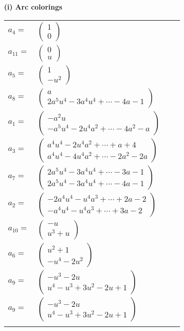 \documentclass[1p]{elsarticle_modified}
\theoremstyle{definition}
\begin{document}
\flushleft \textbf{(i) Arc colorings}\\
\begin{tabular}{m{7pt} m{180pt} m{7pt} m{180pt} }
\flushright $a_{4}=$&$\begin{pmatrix}1\\0\end{pmatrix}$ \\
\flushright $a_{11}=$&$\begin{pmatrix}0\\u\end{pmatrix}$ \\
\flushright $a_{5}=$&$\begin{pmatrix}1\\- u^2\end{pmatrix}$ \\
\flushright $a_{8}=$&$\begin{pmatrix}a\\2 a^5 u^4-3 a^4 u^4+\cdots-4 a-1\end{pmatrix}$ \\
\flushright $a_{1}=$&$\begin{pmatrix}- a^2 u\\- a^5 u^4-2 u^4 a^2+\cdots-4 a^2- a\end{pmatrix}$ \\
\flushright $a_{3}=$&$\begin{pmatrix}a^4 u^4-2 u^4 a^2+\cdots+a+4\\a^4 u^4-4 u^4 a^2+\cdots-2 a^2-2 a\end{pmatrix}$ \\
\flushright $a_{7}=$&$\begin{pmatrix}2 a^5 u^4-3 a^4 u^4+\cdots-3 a-1\\2 a^5 u^4-3 a^4 u^4+\cdots-4 a-1\end{pmatrix}$ \\
\flushright $a_{2}=$&$\begin{pmatrix}-2 a^4 u^4- u^4 a^3+\cdots+2 a-2\\- a^4 u^4- u^4 a^3+\cdots+3 a-2\end{pmatrix}$ \\
\flushright $a_{10}=$&$\begin{pmatrix}- u\\u^3+u\end{pmatrix}$ \\
\flushright $a_{6}=$&$\begin{pmatrix}u^2+1\\- u^4-2 u^2\end{pmatrix}$ \\
\flushright $a_{9}=$&$\begin{pmatrix}- u^3-2 u\\u^4- u^3+3 u^2-2 u+1\end{pmatrix}$\\ \flushright $a_{9}=$&$\begin{pmatrix}- u^3-2 u\\u^4- u^3+3 u^2-2 u+1\end{pmatrix}$\\&\end{tabular}
\end{document}
